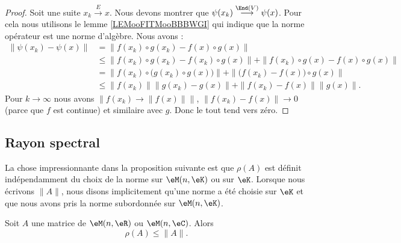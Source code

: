 \begin{proof}
    Soit une suite \( x_k\stackrel{E}{\longrightarrow}x\). Nous devons montrer que \( \psi(x_k)\stackrel{\End(V)}{\longrightarrow}\psi(x)\). Pour cela nous utilisons le lemme \ref{LEMooFITMooBBBWGI} qui indique que la norme opérateur est une norme d'algèbre. Nous avons :
    \begin{subequations}
        \begin{align}
            \| \psi(x_k)-\psi(x) \|&=\| f(x_k)\circ g(x_k)-f(x)\circ g(x) \|\\
            &\leq \| f(x_k)\circ g(x_k)-f(x_k)\circ g(x) \|+\| f(x_k)\circ g(x)-f(x)\circ g(x) \|\\
            &=\| f(x_k)\circ \big( g(x_k)\circ g(x) \big) \|+\| \big(f(x_k)-f(x)\big)\circ g(x) \|\\
            &\leq \| f(x_k) \|\| g(x_k)-g(x) \|+\| f(x_k)-f(x) \|\| g(x) \|.
        \end{align}
    \end{subequations}
    Pour \( k\to \infty\) nous avons \( \| f(x_k)\to \| f(x) \| \|\), \( \| f(x_k)-f(x) \|\to 0\) (parce que \( f\) est continue) et similaire avec \( g\). Donc le tout tend vers zéro.
\end{proof}

\subsection{Rayon spectral}

La chose impressionnante dans la proposition suivante est que \( \rho(A)\) est définit indépendamment du choix de la norme sur \( \eM(n,\eK)\) ou sur \( \eK\). Lorsque nous écrivons \( \| A \|\), nous disons implicitement qu'une norme a été choisie sur \( \eK\) et que nous avons pris la norme subordonnée sur \( \eM(n,\eK)\).
\begin{proposition}      \label{PROPooWZJBooTPLSZp}
    Soit \( A\) une matrice de \( \eM(n,\eR)\) ou \( \eM(n,\eC)\). Alors
    \begin{equation}
        \rho(A)\leq \| A \|.
    \end{equation}
\end{proposition}

